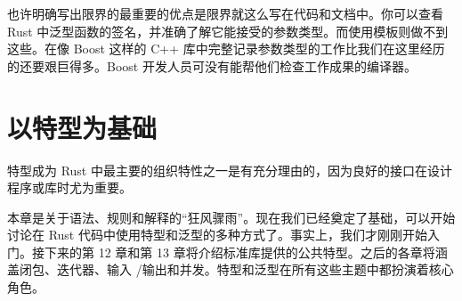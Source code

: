 也许明确写出限界的最重要的优点是限界就这么写在代码和文档中。你可以查看 Rust 中泛型函数的签名，并准确了解它能接受的参数类型。而使用模板则做不到这些。在像 Boost 这样的 C++ 库中完整记录参数类型的工作比我们在这里经历的还要艰巨得多。Boost 开发人员可没有能帮他们检查工作成果的编译器。

\section{以特型为基础}

特型成为 Rust 中最主要的组织特性之一是有充分理由的，因为良好的接口在设计程序或库时尤为重要。

本章是关于语法、规则和解释的“狂风骤雨”。现在我们已经奠定了基础，可以开始讨论在 Rust 代码中使用特型和泛型的多种方式了。事实上，我们才刚刚开始入门。接下来的第 12 章和第 13 章将介绍标准库提供的公共特型。之后的各章将涵盖闭包、迭代器、输入 /输出和并发。特型和泛型在所有这些主题中都扮演着核心角色。

